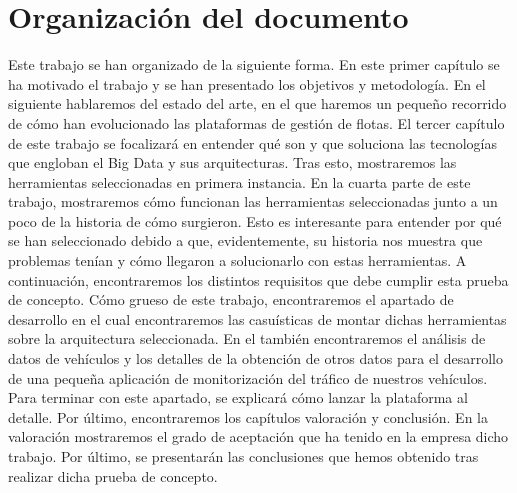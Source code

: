 \section{Organización del documento\label{organizacion}}

Este trabajo se han organizado de la siguiente forma. En este primer
capítulo se ha motivado el trabajo y se han presentado los objetivos
y metodología. En el siguiente hablaremos del estado del arte, en el
que haremos un pequeño recorrido de cómo han evolucionado las
plataformas de gestión de flotas. El tercer capítulo de este trabajo
se focalizará en entender qué son y que soluciona las tecnologías que
engloban el Big Data y sus arquitecturas. Tras esto, mostraremos las
herramientas seleccionadas en primera instancia. En la cuarta parte de
este trabajo, mostraremos cómo funcionan las herramientas seleccionadas
junto a un poco de la historia de cómo surgieron. Esto es interesante
para entender por qué se han seleccionado debido a que, evidentemente,
su historia nos muestra que problemas tenían y cómo llegaron a
solucionarlo con estas herramientas. A continuación, encontraremos
los distintos requisitos que debe cumplir esta prueba de concepto.
Cómo grueso de este trabajo, encontraremos el apartado de desarrollo
en el cual encontraremos las casuísticas de montar dichas herramientas
sobre la arquitectura seleccionada. En el también encontraremos el
análisis de datos de vehículos y los detalles de la obtención de otros
datos para el desarrollo de una pequeña aplicación de monitorización del
tráfico de nuestros vehículos. Para terminar con este apartado, se
explicará cómo lanzar la plataforma al detalle. Por último, encontraremos
los capítulos valoración y conclusión. En la valoración mostraremos el
grado de aceptación que ha tenido en la empresa dicho trabajo. Por último,
se presentarán las conclusiones que hemos obtenido tras realizar dicha
prueba de concepto.

